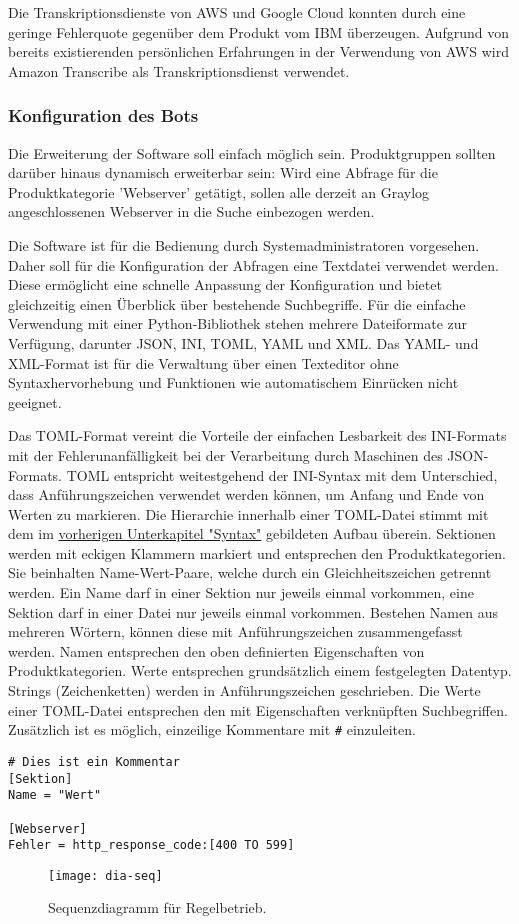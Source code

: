 Die Transkriptionsdienste von AWS und Google Cloud konnten durch eine geringe Fehlerquote gegenüber dem Produkt vom IBM überzeugen. Aufgrund von bereits existierenden persönlichen Erfahrungen in der Verwendung von AWS wird Amazon Transcribe als Transkriptionsdienst verwendet.

\subsubsection{Konfiguration des Bots}

Die Erweiterung der Software soll einfach möglich sein. Produktgruppen sollten darüber hinaus dynamisch erweiterbar sein: Wird eine Abfrage für die Produktkategorie 'Webserver' getätigt, sollen alle derzeit an Graylog angeschlossenen Webserver in die Suche einbezogen werden. 

Die Software ist für die Bedienung durch Systemadministratoren vorgesehen. Daher soll für die Konfiguration der Abfragen eine Textdatei verwendet werden. Diese ermöglicht eine schnelle Anpassung der Konfiguration und bietet gleichzeitig einen Überblick über bestehende Suchbegriffe. Für die einfache Verwendung mit einer Python-Bibliothek stehen mehrere Dateiformate zur Verfügung, darunter JSON, INI, TOML, YAML und XML. Das YAML- und XML-Format ist für die Verwaltung über einen Texteditor ohne Syntaxhervorhebung und Funktionen wie automatischem Einrücken nicht geeignet. 

Das TOML-Format vereint die Vorteile der einfachen Lesbarkeit des INI-Formats mit der Fehlerunanfälligkeit bei der Verarbeitung durch Maschinen des JSON-Formats. TOML entspricht weitestgehend der INI-Syntax mit dem Unterschied, dass Anführungszeichen verwendet werden können, um Anfang und Ende von Werten zu markieren. Die Hierarchie innerhalb einer TOML-Datei stimmt mit dem im \hyperref[sec:syntax]{vorherigen Unterkapitel "Syntax"} gebildeten Aufbau überein. Sektionen werden mit eckigen Klammern markiert und entsprechen den Produktkategorien. Sie beinhalten Name-Wert-Paare, welche durch ein Gleichheitszeichen getrennt werden. Ein Name darf in einer Sektion nur jeweils einmal vorkommen, eine Sektion darf in einer Datei nur jeweils einmal vorkommen. Bestehen Namen aus mehreren Wörtern, können diese mit Anführungszeichen zusammengefasst werden. Namen entsprechen den oben definierten Eigenschaften von Produktkategorien. Werte entsprechen grundsätzlich einem festgelegten Datentyp. Strings (Zeichenketten) werden in Anführungszeichen geschrieben. Die Werte einer TOML-Datei entsprechen den mit Eigenschaften verknüpften Suchbegriffen. Zusätzlich ist es möglich, einzeilige Kommentare mit \lstinline{#} einzuleiten.

\begin{lstlisting}[caption={Beispiel der TOML-Syntax.}, label=toml-syntax, xleftmargin=6mm]
# Dies ist ein Kommentar
[Sektion]
Name = "Wert"

[Webserver]
Fehler = http_response_code:[400 TO 599] 
\end{lstlisting}

\begin{figure}[h!]
\centering
\texttt{[image: dia-seq]}
\caption{Sequenzdiagramm für Regelbetrieb.}
\label{fig:dia-seq}
\end{figure}
